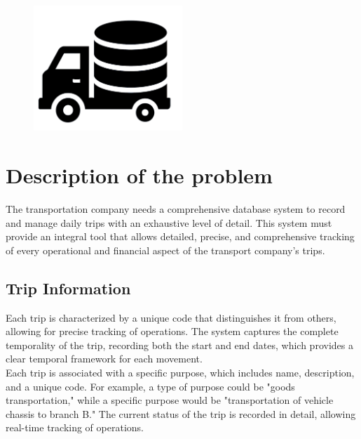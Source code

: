 \documentclass[11pt, a4paper]{article}
\title{\normalfont\spacedallcaps{Database design for transportation company}}
\author{\spacedlowsmallcaps{CarlosFOL}}
\date{}
\begin{document}

\maketitle



\tableofcontents

\vspace{2in}

\begin{figure}[h!]
    \centering
    \includegraphics[width=0.5\textwidth]{img/logo.png}
    \label{logo_db}
\end{figure}


\newpage


\section{Description of the problem}

The transportation company needs a comprehensive database system to record and manage daily trips with an exhaustive level of detail. This system must provide an integral tool that allows detailed, precise, and comprehensive tracking of every operational and financial aspect of the transport company's trips.\\

\subsection{Trip Information}
Each trip is characterized by a unique code that distinguishes it from others, allowing for precise tracking of operations. The system captures the complete temporality of the trip, recording both the start and end dates, which provides a clear temporal framework for each movement.\\

Each trip is associated with a specific purpose, which includes name, description, and a unique code. For example, a type of purpose could be "goods transportation," while a specific purpose would be "transportation of vehicle chassis to branch B." The current status of the trip is recorded in detail, allowing real-time tracking of operations.\\
\end{document}
